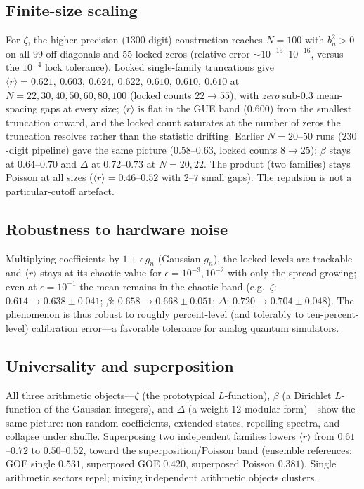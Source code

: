 \documentclass[aps,prx,reprint,floatfix]{revtex4-2}
\begin{document}
\subsection{Finite-size scaling}
\label{sec:e3}
For $\zeta$, the higher-precision ($1300$-digit) construction reaches
$N=100$ with $b_n^2>0$ on all $99$ off-diagonals and $55$ locked zeros
(relative error $\sim10^{-15}$--$10^{-16}$, versus the $10^{-4}$ lock
tolerance). Locked single-family truncations give
$\langle r\rangle=0.621,\ 0.603,\ 0.624,\ 0.622,\ 0.610,\ 0.610,\ 0.610$
at $N=22,30,40,50,60,80,100$ (locked counts $22\to55$), with \emph{zero}
sub-$0.3$ mean-spacing gaps at every size; $\langle r\rangle$ is flat in
the GUE band ($0.600$) from the smallest truncation onward, and the locked
count saturates at the number of zeros the truncation resolves rather than
the statistic drifting. Earlier $N=20$--$50$ runs ($230$-digit pipeline)
gave the same picture ($0.58$--$0.63$, locked counts $8\to25$); $\beta$
stays at $0.64$--$0.70$ and $\Delta$ at $0.72$--$0.73$ at $N=20,22$. The
product (two families) stays Poisson at all sizes ($\langle r\rangle
=0.46$--$0.52$ with $2$--$7$ small gaps). The repulsion is not a
particular-cutoff artefact.

\subsection{Robustness to hardware noise}
\label{sec:noise}
Multiplying coefficients by $1+\epsilon\,g_n$ (Gaussian $g_n$), the locked
levels are trackable and $\langle r\rangle$ stays at its chaotic value for
$\epsilon=10^{-3},10^{-2}$ with only the spread growing; even at
$\epsilon=10^{-1}$ the mean remains in the chaotic band (e.g.\ $\zeta$:
$0.614\to0.638\pm0.041$; $\beta$: $0.658\to0.668\pm0.051$; $\Delta$:
$0.720\to0.704\pm0.048$). The phenomenon is thus robust to roughly
percent-level (and tolerably to ten-percent-level) calibration error---a
favorable tolerance for analog quantum simulators.

\subsection{Universality and superposition}
\label{sec:univ}
All three arithmetic objects---$\zeta$ (the prototypical $L$-function),
$\beta$ (a Dirichlet $L$-function of the Gaussian integers), and $\Delta$
(a weight-$12$ modular form)---show the same picture: non-random
coefficients, extended states, repelling spectra, and collapse under
shuffle. Superposing two independent families lowers $\langle r\rangle$
from $0.61$--$0.72$ to $0.50$--$0.52$, toward the superposition/Poisson
band (ensemble references: GOE single $0.531$, superposed GOE $0.420$,
superposed Poisson $0.381$). Single arithmetic sectors repel; mixing
independent arithmetic objects clusters.
\end{document}

